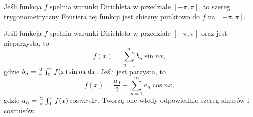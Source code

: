 \begin{theorem}
    Jeśli funkcja $f$ spełnia warunki Dirichleta w przedziale $[-\pi, \pi]$, to szereg trygonometryczny Fouriera tej funkcji jest zbieżny punktowo do $f$ na $[-\pi, \pi]$.
\end{theorem}

\begin{remark}
    Jeśli funkcja $f$ spełnia warunki Dirichleta w przedziale $[-\pi, \pi]$ oraz jest nieparzysta, to
    \[ f(x) = \sum_{n=1}^\infty b_n\sin nx, \]
    gdzie $b_n = \frac{2}{\pi}\int_0^\pi f(x)\sin nx \operatorname{d}\!{x}$. Jeśli jest parzysta, to
    \[ f(x) = \frac{a_0}{2} + \sum_{n=1}^\infty a_n\cos nx, \]
    gdzie $a_n = \frac{2}{\pi}\int_0^\pi f(x)\cos nx \operatorname{d}\!{x}$. Tworzą one wtedy odpowiednio szereg sinusów i cosinusów.
\end{remark}

